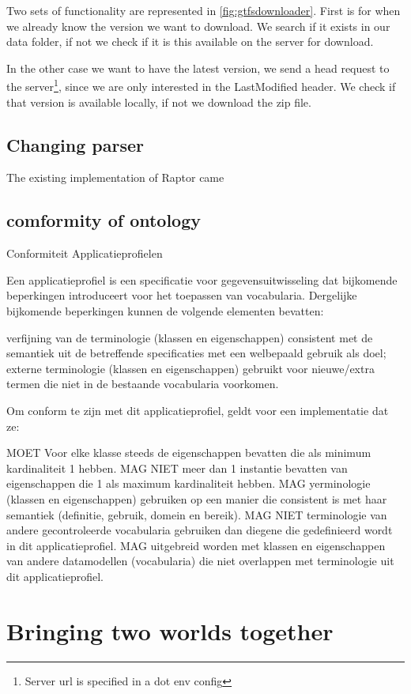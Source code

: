 Two sets of functionality are represented in \autoref{fig:gtfsdownloader}. First is for when we already know the version we want to download. We search if it exists in our data folder, if not we check if it is this available on the server for download.

In the other case we want to have the latest version, we send a head request to the server\footnote{Server url is specified in a dot env config}, since we are only interested in the LastModified header. We check if that version is available locally, if not we download the zip file.

\subsection{Changing parser}
The existing implementation of Raptor came
\subsection{comformity of ontology}
\cite{noauthor_conformiteit_nodate}
Conformiteit Applicatieprofielen

Een applicatieprofiel is een specificatie voor gegevensuitwisseling dat bijkomende beperkingen introduceert voor het toepassen van vocabularia. Dergelijke bijkomende beperkingen kunnen de volgende elementen bevatten:

    verfijning van de terminologie (klassen en eigenschappen) consistent met de semantiek uit de betreffende specificaties met een welbepaald gebruik als doel;
    externe terminologie (klassen en eigenschappen) gebruikt voor nieuwe/extra termen die niet in de bestaande vocabularia voorkomen.

Om conform te zijn met dit applicatieprofiel, geldt voor een implementatie dat ze:

    MOET Voor elke klasse steeds de eigenschappen bevatten die als minimum kardinaliteit 1 hebben.
    MAG NIET meer dan 1 instantie bevatten van eigenschappen die 1 als maximum kardinaliteit hebben.
    MAG yerminologie (klassen en eigenschappen) gebruiken op een manier die consistent is met haar semantiek (definitie, gebruik, domein en bereik).
    MAG NIET terminologie van andere gecontroleerde vocabularia gebruiken dan diegene die gedefinieerd wordt in dit applicatieprofiel.
    MAG uitgebreid worden met klassen en eigenschappen van andere datamodellen (vocabularia) die niet overlappen met terminologie uit dit applicatieprofiel.

\section{Bringing two worlds together}